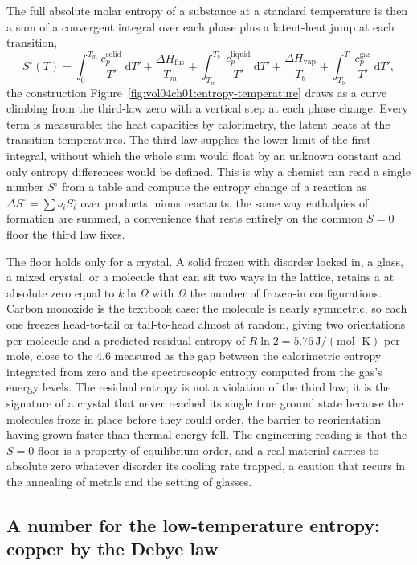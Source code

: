 The full absolute molar entropy of a substance at a standard temperature is then a
sum of a convergent integral over each phase plus a latent-heat jump at each
transition,
\[
S^\circ(T) = \int_0^{T_m}\!\frac{c_p^{\text{solid}}}{T'}\,\mathrm{d}T'
+ \frac{\Delta H_{\text{fus}}}{T_m}
+ \int_{T_m}^{T_b}\!\frac{c_p^{\text{liquid}}}{T'}\,\mathrm{d}T'
+ \frac{\Delta H_{\text{vap}}}{T_b}
+ \int_{T_b}^{T}\!\frac{c_p^{\text{gas}}}{T'}\,\mathrm{d}T',
\]
the construction Figure~\ref{fig:vol04ch01:entropy-temperature} draws as a curve
climbing from the third-law zero with a vertical step at each phase change. Every
term is measurable: the heat capacities by calorimetry, the latent heats at the
transition temperatures. The third law supplies the lower limit of the first
integral, without which the whole sum would float by an unknown constant and only
entropy differences would be defined. This is why a chemist can read a single
number $S^\circ$ from a table and compute the entropy change of a reaction as
$\Delta S^\circ = \sum \nu_i S^\circ_i$ over products minus reactants, the same way
enthalpies of formation are summed, a convenience that rests entirely on the
common $S = 0$ floor the third law fixes.

The floor holds only for a  crystal. A solid frozen with disorder
locked in, a glass, a mixed crystal, or a molecule that can sit two ways in the
lattice, retains a  at absolute zero equal to
$k\ln \Omega$ with $\Omega$ the number of frozen-in configurations. Carbon monoxide
is the textbook case: the molecule is nearly symmetric, so each one freezes head-to-tail
or tail-to-head almost at random, giving two orientations per molecule and a
predicted residual entropy of $R\ln 2 = 5.76\,\text{J}/(\text{mol}\cdot\si{\kelvin})$
per mole, close to the $4.6$ measured as the gap between the calorimetric entropy
integrated from zero and the spectroscopic entropy computed from the gas's energy
levels. The residual entropy is not a violation of the third law; it is the
signature of a crystal that never reached its single true ground state because the
molecules froze in place before they could order, the barrier to reorientation
having grown faster than thermal energy fell. The engineering reading is that the
$S = 0$ floor is a property of equilibrium order, and a real material carries to
absolute zero whatever disorder its cooling rate trapped, a caution that recurs in
the annealing of metals and the setting of glasses.

\subsection{A number for the low-temperature entropy: copper by the Debye law}

